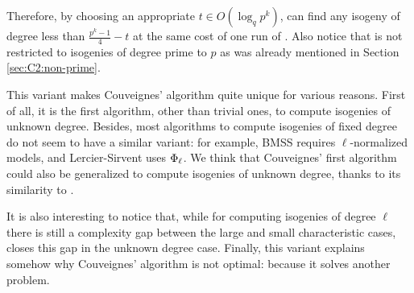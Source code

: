 Therefore, by choosing an appropriate $t\in O(\log_q p^k)$, \ctwoud{} can
find any isogeny of degree less than $\frac{p^k-1}{4}-t$ at the same
cost of one run of \ctwo{}. Also notice that \ctwoud{} is not restricted to
isogenies of degree prime to $p$ as was already mentioned in Section
\ref{sec:C2:non-prime}.

\begin{nota}
  This variant makes Couveignes' algorithm quite unique for various
  reasons. First of all, it is the first algorithm, other than trivial
  ones, to compute isogenies of unknown degree. Besides, most
  algorithms to compute isogenies of fixed degree do not seem to have
  a similar variant: for example, BMSS requires $\ell$-normalized
  models, and Lercier-Sirvent uses $\Phi_\ell$. We think that
  Couveignes' first algorithm~\cite{couveignes94} could also be
  generalized to compute isogenies of unknown degree, thanks to its
  similarity to \ctwo{}.

  It is also interesting to notice that, while for computing isogenies
  of degree $\ell$ there is still a complexity gap between the large
  and small characteristic cases, \ctwoud{} closes this gap in the unknown
  degree case. Finally, this variant explains somehow why Couveignes'
  algorithm is not optimal: because it solves another problem.
\end{nota}



%
